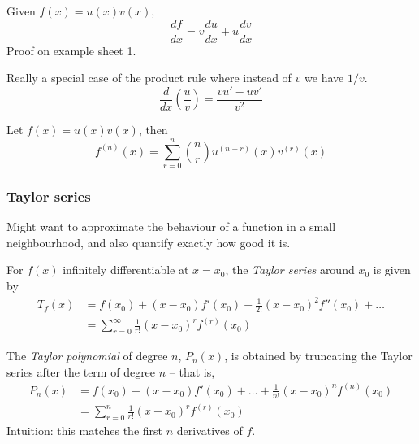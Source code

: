 \documentclass{../template/note}
\begin{document}
    \begin{theorem}
        Given \(f(x) = u(x)v(x)\),
        \[
            \frac{df}{dx} = v \frac{du}{dx} + u \frac{dv}{dx}
        \]
        Proof on example sheet 1.
    \end{theorem}
    
    \begin{theorem}
        Really a special case of the product rule where instead of \(v\) we have \(1/v\).
        \[
            \frac{d}{dx} \left(\frac{u}{v}\right) = \frac{vu'-uv'}{v^2}
        \]
    \end{theorem}
    
    \begin{theorem}
        Let \(f(x) = u(x)v(x)\), then
        \[
            f^{(n)}(x) = \sum_{r=0}^n \binom{n}{r} u^{(n-r)}(x) v^{(r)}(x) 
        \]
    \end{theorem}
    
    \subsubsection{Taylor series}

    Might want to approximate the behaviour of a function in a small neighbourhood, and also quantify exactly how good it is.


    \begin{definition}
        For \(f(x)\) infinitely differentiable at \(x=x_0\), the \emph{Taylor series} around \(x_0\) is given by
        \begin{align*}
            T_f(x) &= f(x_0) + (x-x_0)f'(x_0) + \frac{1}{2!}(x-x_0)^2f''(x_0) + \dots \\
            &= \sum_{r=0}^\infty \frac{1}{r!}(x-x_0)^rf^{(r)}(x_0)
        \end{align*}
    \end{definition}
    
    \begin{definition}
        The \emph{Taylor polynomial} of degree \(n\), \(P_n(x)\), is obtained by truncating the Taylor series after the term of degree \(n\) -- that is,
        \begin{align*}
            P_n(x) &= f(x_0) + (x-x_0)f'(x_0) + \dots + \frac{1}{n!}(x-x_0)^n f^{(n)}(x_0) \\
            &= \sum_{r=0}^n \frac{1}{r!}(x-x_0)^rf^{(r)}(x_0)
        \end{align*}
        Intuition: this matches the first \(n\) derivatives of \(f\).
        
    \end{definition}
    
\end{document}
